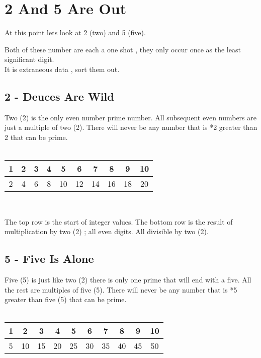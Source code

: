 \documentclass[12pt,letterpaper,oneside,titlepage]{article}
\begin{document}
\section{2 And 5 Are Out}
\par 
\tab At this point lets look at 2 (two) and 5 (five).
\\
\par 
Both of these number are each a one shot , they only occur once 
as the least significant digit.
\\
It is extraneous data , sort them out.
\\
\subsection{2 - Deuces Are Wild}
\par 
\tab Two (2) is the only even number prime number. 
All subsequent even numbers are just a multiple of two (2). 
There will never be any number that is *2 greater than 2 that can be prime.
\\
\\
\begin{tabular}{|c|c|c|c|c|c|c|c|c|c|}
	\hline 
	1 & 2 & 3 & 4 & 5 & 6 & 7 & 8 & 9 & 10 \\ 
	\hline 
	2 & 4 & 6 & 8 &10  &12  &14  &16  &18 & 20 \\ 
	\hline 
\end{tabular}  
\\

\par 
The top row is the start of integer values. The bottom row is the result of multiplication by two (2)  ; all even digits.
All divisible by two (2).
\subsection{5 - Five Is Alone}
\par 
\tab Five (5) is just like two (2) there is only one prime that will end with a five. All the rest are multiples of five (5). There will never be any number that is *5 greater than five (5) that can be prime.
\\
\\
\begin{tabular}{|c|c|c|c|c|c|c|c|c|c|}
	\hline 
	1 & 2 & 3 & 4 & 5 & 6 & 7 & 8 & 9 & 10 \\ 
	\hline 
	5 & 10 & 15 & 20 & 25  &30  &35  &40  &45 & 50 \\ 
	\hline 
\end{tabular}  
\\
\end{document}
